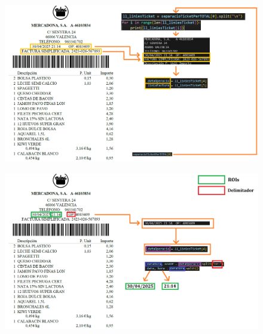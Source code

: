 \documentclass{beamer}
\begin{document}
		
		\begin{frame}
			\begin{figure}
				\centering
				\includegraphics[width=1\linewidth]{imgEspecifiques/ticketExtraccioI.png}
				\label{fig:ticketExtraccioI}
			\end{figure}
		\end{frame}
		
		\begin{frame}
			\begin{figure}
				\centering
				\includegraphics[width=1\linewidth]{imgEspecifiques/ticketExtraccioJ.png}
				\label{fig:ticketExtraccioJ}
			\end{figure}
		\end{frame}
		
\end{document}
